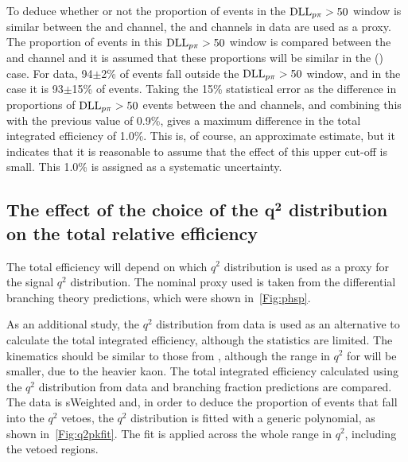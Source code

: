 To deduce whether or not the proportion of events in the $\mathrm{DLL}_{{p}{\pi}}>50$ window is similar between the \Lbpijpsi and \Lbpi channel, the \LbK and \LbKjpsi channels in data are used as a proxy. The proportion of events in this $\mathrm{DLL}_{{p}{\pi}}>50$ window is compared between the \LbK and \LbKjpsi channel and it is assumed that these proportions will be similar in the \Lbpijpsi (\Lbpi) case. For \LbKjpsi data,  94$\pm$2\% of events fall outside the $\mathrm{DLL}_{{p}{\pi}}>50$ window, and in the \LbK case it is 93$\pm$15\% of events. Taking the 15\% statistical error as the difference in proportions of $\mathrm{DLL}_{{p}{\pi}}>50$ events between the \LbK and \LbKjpsi channels, and combining this with the previous value of 0.9\%, gives a maximum difference in the total integrated efficiency of 1.0\%. This is, of course, an approximate estimate, but it indicates that it is reasonable to assume that the effect of this upper cut-off is small. This 1.0\% is assigned as a systematic uncertainty.




\subsection[The effect of the choice of the $q^{2}$ distribution on the total relative efficiency]{The effect of the choice of the $\mathbold{q^{2}}$ distribution on the total relative efficiency}
\label{subsec:bdtq2}
The total efficiency will depend on which $q^{2}$ distribution is used as a proxy for the signal $q^{2}$ distribution. The nominal proxy used is taken from the \LbL differential branching theory predictions, which were shown in~\autoref{Fig:phsp}.

As an additional study, the $q^{2}$ distribution from \LbK data is used as an alternative to calculate the total integrated efficiency, although the statistics are limited. The \LbK kinematics should be similar to those from \Lbpi, although the range in $q^{2}$ for \LbK will be smaller, due to the heavier kaon. The total integrated efficiency calculated using the $q^{2}$ distribution from \LbK data and \LbL branching fraction predictions are compared. The \LbK data is sWeighted and, in order to deduce the proportion of \LbK events that fall into the $q^{2}$ vetoes, the $q^{2}$ distribution is fitted with a generic polynomial, as shown in~\autoref{Fig:q2pkfit}. The fit is applied across the whole range in $q^{2}$, including the vetoed regions. %

